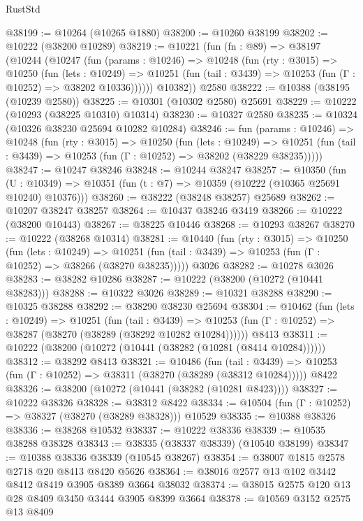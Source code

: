 \begin{lexlean}{RustStd}
\begin{coremodule}
@38199 := @10264 (@10265 @1880)
@38200 := @10260 @38199
@38202 := @10222 (@38200 @10289)
@38219 := @10221
    (fun (fn : @89) =>
    @38197
      (@10244
        (@10247
          (fun (params : @10246) =>
          @10248
            (fun (rty : @3015) =>
            @10250
              (fun (lets : @10249) =>
              @10251 (fun (tail : @3439) => @10253 (fun (Γ : @10252) => @38202 @10336))))))
        @10382))
    @2580
@38222 := @10388 (@38195 (@10239 @2580))
@38225 := @10301 (@10302 @2580) @25691
@38229 := @10222 (@10293 (@38225 @10310) @10314)
@38230 := @10327 @2580
@38235 := @10324 (@10326 @38230 @25694 @10282 @10284)
@38246 := fun (params : @10246) =>
  @10248
    (fun (rty : @3015) =>
    @10250
      (fun (lets : @10249) =>
      @10251 (fun (tail : @3439) => @10253 (fun (Γ : @10252) => @38202 (@38229 @38235)))))
@38247 := @10247 @38246
@38248 := @10244 @38247
@38257 := @10350
    (fun (U : @10349) => @10351 (fun (t : @7) => @10359 (@10222 (@10365 @25691 @10240) @10376)))
@38260 := @38222 (@38248 @38257) @25689
@38262 := @10207 @38247 @38257
@38264 := @10437 @38246 @3419
@38266 := @10222 (@38200 @10443)
@38267 := @38225 @10446
@38268 := @10293 @38267
@38270 := @10222 (@38268 @10314)
@38281 := @10440
    (fun (rty : @3015) =>
    @10250
      (fun (lets : @10249) =>
      @10251 (fun (tail : @3439) => @10253 (fun (Γ : @10252) => @38266 (@38270 @38235)))))
    @3026
@38282 := @10278 @3026
@38283 := @38282 @10286
@38287 := @10222 (@38200 (@10272 (@10441 @38283)))
@38288 := @10322 @3026
@38289 := @10321 @38288
@38290 := @10325 @38288
@38292 := @38290 @38230 @25694
@38304 := @10462
    (fun (lets : @10249) =>
    @10251
      (fun (tail : @3439) =>
      @10253 (fun (Γ : @10252) => @38287 (@38270 (@38289 (@38292 @10282 @10284))))))
    @8413
@38311 := @10222 (@38200 (@10272 (@10441 (@38282 (@10281 (@8414 @10284))))))
@38312 := @38292 @8413
@38321 := @10486
    (fun (tail : @3439) => @10253 (fun (Γ : @10252) => @38311 (@38270 (@38289 (@38312 @10284)))))
    @8422
@38326 := @38200 (@10272 (@10441 (@38282 (@10281 @8423))))
@38327 := @10222 @38326
@38328 := @38312 @8422
@38334 := @10504 (fun (Γ : @10252) => @38327 (@38270 (@38289 @38328))) @10529
@38335 := @10388 @38326
@38336 := @38268 @10532
@38337 := @10222 @38336
@38339 := @10535 @38288 @38328
@38343 := @38335 (@38337 @38339) (@10540 @38199)
@38347 := @10388 @38336 @38339 (@10545 @38267)
@38354 := @38007 @1815 @2578 @2718 @20 @8413 @8420 @5626
@38364 := @38016 @2577 @13 @102 @3442 @8412 @8419 @3905 @8389 @3664 @38032
@38374 := @38015 @2575 @120 @13 @28 @8409 @3450 @3444 @3905 @8399 @3664
@38378 := @10569 @3152 @2575 @13 @8409

\end{coremodule}
\end{lexlean}
